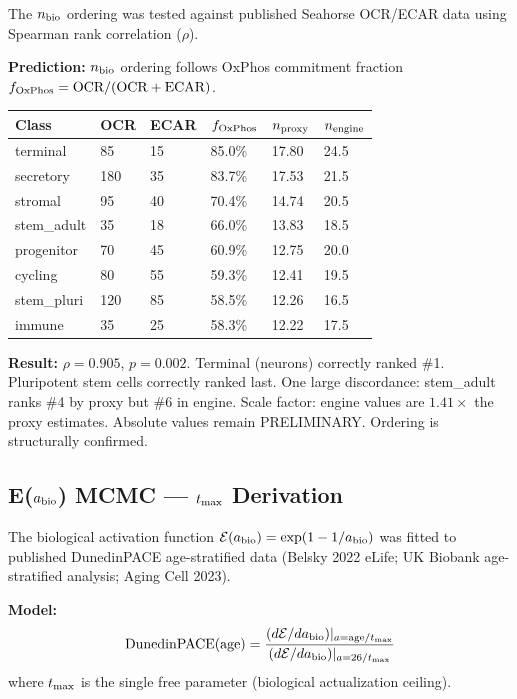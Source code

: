 \documentclass[12pt,a4paper]{article}
\begin{document}
The $n_{\rm bio}$ ordering was tested against published Seahorse OCR/ECAR data
using Spearman rank correlation ($\rho$).

\textbf{Prediction:} $n_{\rm bio}$ ordering follows OxPhos commitment fraction
$f_{\rm OxPhos} = \text{OCR}/(\text{OCR}+\text{ECAR})$.

\begin{center}
\renewcommand{\arraystretch}{1.2}
\begin{tabular}{llllll}
\toprule
\textbf{Class} & \textbf{OCR} & \textbf{ECAR} & \textbf{$f_{\rm OxPhos}$} &
\textbf{$n_{\rm proxy}$} & \textbf{$n_{\rm engine}$} \\
\midrule
terminal    & 85  & 15  & 85.0\% & 17.80 & 24.5 \\
secretory   & 180 & 35  & 83.7\% & 17.53 & 21.5 \\
stromal     & 95  & 40  & 70.4\% & 14.74 & 20.5 \\
stem\_adult & 35  & 18  & 66.0\% & 13.83 & 18.5 \\
progenitor  & 70  & 45  & 60.9\% & 12.75 & 20.0 \\
cycling     & 80  & 55  & 59.3\% & 12.41 & 19.5 \\
stem\_pluri & 120 & 85  & 58.5\% & 12.26 & 16.5 \\
immune      & 35  & 25  & 58.3\% & 12.22 & 17.5 \\
\bottomrule
\end{tabular}
\end{center}

\noindent \textbf{Result:} $\rho = 0.905$, $p = 0.002$.
Terminal (neurons) correctly ranked \#1. Pluripotent stem cells correctly ranked last.
One large discordance: stem\_adult ranks \#4 by proxy but \#6 in engine.
Scale factor: engine values are $1.41\times$ the proxy estimates.
Absolute values remain PRELIMINARY. Ordering is structurally confirmed.

\subsection{E($a_{\rm bio}$) MCMC --- $t_{\rm max}$ Derivation}
\label{subsec:e_abio}

The biological activation function $\mathcal{E}(a_{\rm bio}) = \exp(1 - 1/a_{\rm bio})$
was fitted to published DunedinPACE age-stratified data (Belsky 2022 eLife;
UK Biobank age-stratified analysis; Aging Cell 2023).

\textbf{Model:}
\begin{equation}
\text{DunedinPACE}({\rm age}) =
\frac{(d\mathcal{E}/da_{\rm bio})|_{a = {\rm age}/t_{\rm max}}}
     {(d\mathcal{E}/da_{\rm bio})|_{a = 26/t_{\rm max}}}
\end{equation}
where $t_{\rm max}$ is the single free parameter
(biological actualization ceiling).
\end{document}

